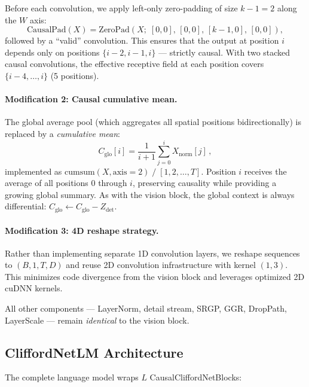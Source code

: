 \documentclass{article}
\begin{document}
Before each convolution, we apply left-only zero-padding of size $k - 1 = 2$ along the $W$ axis:
\begin{equation}
  \text{CausalPad}(X) = \text{ZeroPad}\!\left(X;\; [0,0],\, [0,0],\, [k{-}1, 0],\, [0,0]\right),
  \label{eq:causal_pad}
\end{equation}
followed by a ``valid'' convolution.
This ensures that the output at position $i$ depends only on positions $\{i{-}2, i{-}1, i\}$ --- strictly causal.
With two stacked causal convolutions, the effective receptive field at each position covers $\{i{-}4, \ldots, i\}$ (5 positions).

\paragraph{Modification 2: Causal cumulative mean.}
The global average pool (which aggregates all spatial positions bidirectionally) is replaced by a \emph{cumulative mean}:
\begin{equation}
  C_\text{glo}[i] = \frac{1}{i + 1} \sum_{j=0}^{i} X_\text{norm}[j]\,,
  \label{eq:causal_mean}
\end{equation}
implemented as $\text{cumsum}(X, \text{axis}{=}2) \;/\; [1, 2, \ldots, T]$.
Position $i$ receives the average of all positions $0$ through $i$, preserving causality while providing a growing global summary.
As with the vision block, the global context is always differential: $C_\text{glo} \leftarrow C_\text{glo} - Z_\text{det}$.

\paragraph{Modification 3: 4D reshape strategy.}
Rather than implementing separate 1D convolution layers, we reshape sequences to $(B, 1, T, D)$ and reuse 2D convolution infrastructure with kernel $(1, 3)$.
This minimizes code divergence from the vision block and leverages optimized 2D cuDNN kernels.

All other components --- LayerNorm, detail stream, SRGP, GGR, DropPath, LayerScale --- remain \emph{identical} to the vision block.

\subsection{CliffordNetLM Architecture}

The complete language model wraps $L$ CausalCliffordNetBlocks:
\end{document}
